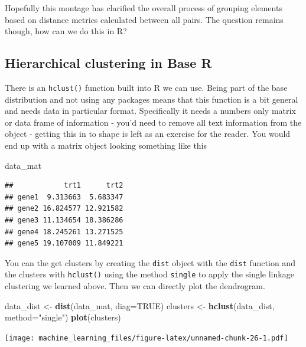 \documentclass[
]{book}
\newenvironment{Shaded}{\begin{snugshade}}{\end{snugshade}}
\newcommand{\DataTypeTok}[1]{\textcolor[rgb]{0.13,0.29,0.53}{#1}}
\newcommand{\KeywordTok}[1]{\textcolor[rgb]{0.13,0.29,0.53}{\textbf{#1}}}
\newcommand{\NormalTok}[1]{#1}
\newcommand{\OtherTok}[1]{\textcolor[rgb]{0.56,0.35,0.01}{#1}}
\newcommand{\StringTok}[1]{\textcolor[rgb]{0.31,0.60,0.02}{#1}}
\begin{document}
Hopefully this montage has clarified the overall process of grouping elements based on distance metrics calculated between all pairs. The question remains though, how can we do this in R?

\hypertarget{hierarchical-clustering-in-base-r}{%
\subsection{Hierarchical clustering in Base R}\label{hierarchical-clustering-in-base-r}}

There is an \texttt{hclust()} function built into R we can use. Being part of the base distribution and not using any packages means that this function is a bit general and needs data in particular format. Specifically it needs a numbers only matrix or data frame of information - you'd need to remove all text information from the object - getting this in to shape is left as an exercise for the reader. You would end up with a matrix object looking something like this

\begin{Shaded}
\begin{Highlighting}[]
\NormalTok{data_mat}
\end{Highlighting}
\end{Shaded}

\begin{verbatim}
##            trt1      trt2
## gene1  9.313663  5.683347
## gene2 16.824577 12.921582
## gene3 11.134654 18.386286
## gene4 18.245261 13.271525
## gene5 19.107009 11.849221
\end{verbatim}

You can the get clusters by creating the \texttt{dist} object with the \texttt{dist} function and the clusters with \texttt{hclust()} using the method \texttt{single} to apply the single linkage clustering we learned above. Then we can directly plot the dendrogram.

\begin{Shaded}
\begin{Highlighting}[]
\NormalTok{data_dist <-}\StringTok{ }\KeywordTok{dist}\NormalTok{(data_mat, }\DataTypeTok{diag=}\OtherTok{TRUE}\NormalTok{)}
\NormalTok{clusters <-}\StringTok{ }\KeywordTok{hclust}\NormalTok{(data_dist, }\DataTypeTok{method=}\StringTok{"single"}\NormalTok{)}
\KeywordTok{plot}\NormalTok{(clusters)}
\end{Highlighting}
\end{Shaded}

\texttt{[image: machine\_learning\_files/figure-latex/unnamed-chunk-26-1.pdf]}
\end{document}
